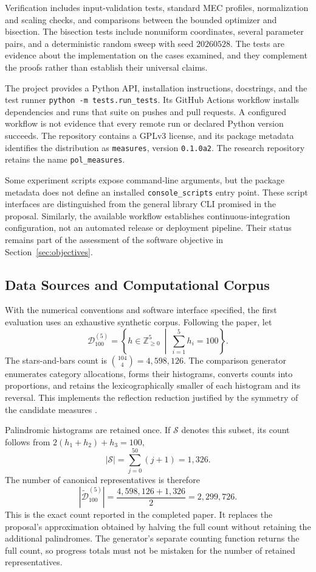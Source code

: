 \documentclass{article}
\theoremstyle{plain}
\theoremstyle{remark}
\begin{document}
Verification includes input-validation tests, standard MEC profiles, normalization and scaling checks, and comparisons between the bounded optimizer and bisection. The bisection tests include nonuniform coordinates, several parameter pairs, and a deterministic random sweep with seed $20260528$. The tests are evidence about the implementation on the cases examined, and they complement the proofs rather than establish their universal claims.

The project provides a Python API, installation instructions, docstrings, and the test runner \texttt{python -m tests.run\_tests}. Its GitHub Actions workflow installs dependencies and runs that suite on pushes and pull requests. A configured workflow is not evidence that every remote run or declared Python version succeeds. The repository contains a GPLv3 license, and its package metadata identifies the distribution as \texttt{measures}, version \texttt{0.1.0a2}. The research repository retains the name \texttt{pol\_measures}.

Some experiment scripts expose command-line arguments, but the package metadata does not define an installed \texttt{console\_\allowbreak scripts} entry point. These script interfaces are distinguished from the general library CLI promised in the proposal. Similarly, the available workflow establishes continuous-integration configuration, not an automated release or deployment pipeline. Their status remains part of the assessment of the software objective in Section~\ref{sec:objectives}.

\subsection{Data Sources and Computational Corpus}\label{sec:data}\label{subsec:methods-data}

With the numerical conventions and software interface specified, the first evaluation uses an exhaustive synthetic corpus. Following the paper, let
\[
\mathcal{D}_{100}^{(5)}=
\left\{h\in\mathbb{Z}_{\geq0}^{5}\ \middle|\ \sum_{i=1}^{5}h_i=100\right\}.
\]
The stars-and-bars count is $\binom{104}{4}=4{,}598{,}126$. The comparison generator enumerates category allocations, forms their histograms, converts counts into proportions, and retains the lexicographically smaller of each histogram and its reversal. This implements the reflection reduction justified by the symmetry of the candidate measures \citep{aranda2026mec}.

Palindromic histograms are retained once. If $\mathscr{S}$ denotes this subset, its count follows from $2(h_1+h_2)+h_3=100$,
\[
|\mathscr{S}|=\sum_{j=0}^{50}(j+1)=1{,}326.
\]
The number of canonical representatives is therefore
\begin{equation}\label{eq:methods-canonical-count}
\left|\widetilde{\mathcal{D}}_{100}^{(5)}\right|
=\frac{4{,}598{,}126+1{,}326}{2}
=2{,}299{,}726.
\end{equation}
This is the exact count reported in the completed paper. It replaces the proposal's approximation obtained by halving the full count without retaining the additional palindromes. The generator's separate counting function returns the full count, so progress totals must not be mistaken for the number of retained representatives.
\end{document}
